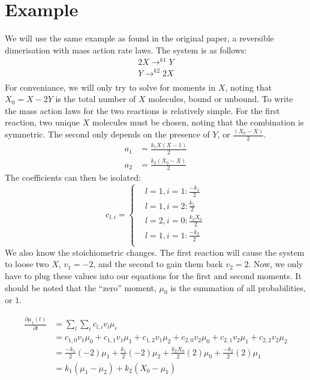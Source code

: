 \documentclass[a4paper,10pt]{article}
\begin{document}
  
 \section{Example}
 We will use the same example as found in the original paper, a reversible dimerisation with mass action rate laws. The system is as follows:
 \begin{align*}
  2X\rightarrow^{k1}Y\\
   Y\rightarrow^{k2}2X\\
 \end{align*}
 For conveniance, we will only try to solve for moments in $X$, noting that $X_0= X-2Y$ is the total number of $X$ molecules, bound or unbound. To write the mass action laws for the two reactions is relatively simple. For the first reaction, two unique $X$ molecules must be chosen, noting that the combination is symmetric. The second only depends on the presence of $Y$, or $\frac{(X_0-X)}{2}$.
 \begin{align*}
   a_{1}&=\frac{k_1 X(X-1)}{2}\\
  a_{2}&=\frac{k_2 (X_0-X)}{2}
 \end{align*}
The coefficients can then be isolated:
$$ c_{l,i}=\begin{cases}
                  &l=1,i=1: \frac{-k_1}{2}\\
                  &l=1,i=2: \frac{k_1}{2}\\
                  &l=2,i=0: \frac{k_2 X_0}{2}\\
                   &l=1,i=1: \frac{-k_2}{2}\\
                 \end{cases}$$
We also know the stoichiometric changes. The first reaction will cause the system to loose two $X$, $v_1=-2$, and the second to gain them back $v_2=2$. Now, we only have to plug these values into our equations for the first and second moments. It should be noted that the ``zero'' moment, $\mu_0$ is the summation of all probabilities, or $1$.

\begin{align*}
 \frac{\partial \mu_1(t)}{\partial t}&=\sum_l \sum_i c_{l,i} v_l \mu_{i}\\
 &= c_{1,0}v_1\mu_0+c_{1,1}v_1\mu_1+c_{1,2}v_1\mu_2+c_{2,0}v_2\mu_0+c_{2,1}v_2\mu_1+c_{2,2}v_2\mu_2\\
 &= \frac{-k_1}{2}(-2)\mu_1 +\frac{k_1}{2}(-2)\mu_2+\frac{k_2 X_0}{2}(2)\mu_0+\frac{-k_2}{2}(2)\mu_1\\
 &= k_1(\mu_1-\mu_2)+k_2(X_0 - \mu_1)
\end{align*}
\end{document}
